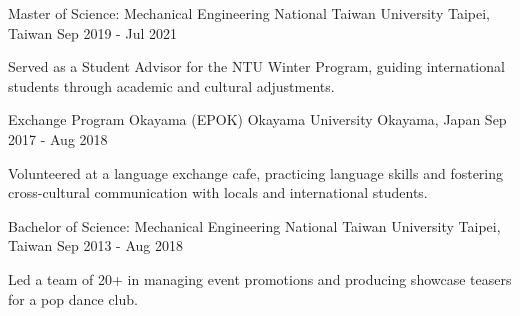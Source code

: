 \begin{cventries}
  \cventry
    {Master of Science: Mechanical Engineering} %
    {National Taiwan University} %
    {Taipei, Taiwan} %
    {Sep 2019 - Jul 2021} %
    {
      \begin{cvitems} %
        \item {Served as a Student Advisor for the NTU Winter Program, guiding international students through academic and cultural adjustments.}
      \end{cvitems}
    }

  \cventry
    {Exchange Program Okayama (EPOK)} %
    {Okayama University} %
    {Okayama, Japan} %
    {Sep 2017 - Aug 2018} %
    {
      \begin{cvitems} %
        \item {Volunteered at a language exchange cafe, practicing language skills and fostering cross-cultural communication with locals and international students.}
      \end{cvitems}
    }

  \cventry
    {Bachelor of Science: Mechanical Engineering} %
    {National Taiwan University} %
    {Taipei, Taiwan} %
    {Sep 2013 - Aug 2018} %
    {
      \begin{cvitems} %
        \item {Led a team of 20+ in managing event promotions and producing showcase teasers for a pop dance club.}
      \end{cvitems}
    }
\end{cventries}

